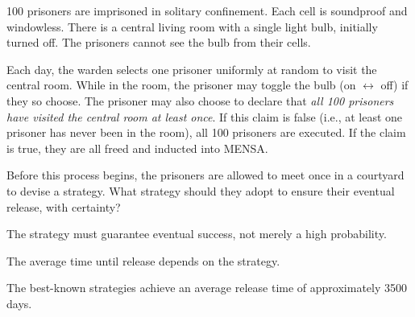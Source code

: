 \begin{problem}
    100 prisoners are imprisoned in solitary confinement. Each cell is soundproof and windowless. There is a central living room with a single light bulb, initially turned off. The prisoners cannot see the bulb from their cells.

    Each day, the warden selects one prisoner uniformly at random to visit the central room. While in the room, the prisoner may toggle the bulb (on \( \leftrightarrow \) off) if they so choose. The prisoner may also choose to declare that \textit{all 100 prisoners have visited the central room at least once}. If this claim is false (i.e., at least one prisoner has never been in the room), all 100 prisoners are executed. If the claim is true, they are all freed and inducted into MENSA.

    Before this process begins, the prisoners are allowed to meet once in a courtyard to devise a strategy. What strategy should they adopt to ensure their eventual release, with certainty?

    The strategy must guarantee eventual success, not merely a high probability.

    The average time until release depends on the strategy.

    The best-known strategies achieve an average release time of approximately 3500 days.
\end{problem}
